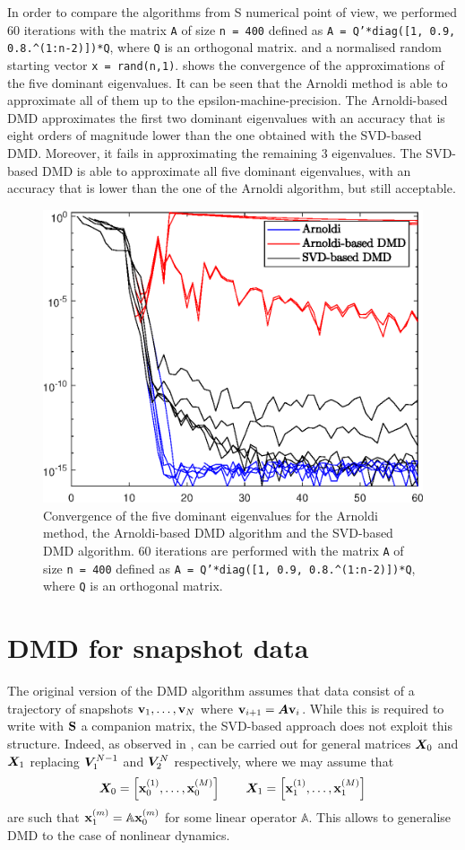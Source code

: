 In order to compare the algorithms from S numerical point of view, we performed 60 iterations with the matrix \texttt{A} of size \texttt{n = 400} defined as \texttt{A = Q'*diag([1, 0.9, 0.8.\^{}(1:n-2)])*Q}, where \texttt{Q} is an orthogonal matrix. and a normalised random starting vector \texttt{x = rand(n,1)}.  shows the convergence of the approximations of the five dominant eigenvalues. It can be seen that the Arnoldi method is able to approximate all of them up to the epsilon-machine-precision. The Arnoldi-based DMD approximates the first two dominant eigenvalues with an accuracy that is eight orders of magnitude lower than the one obtained with the SVD-based DMD. Moreover, it fails in approximating the remaining 3 eigenvalues. The SVD-based DMD is able to approximate all five dominant eigenvalues, with an accuracy that is lower than the one of the Arnoldi algorithm, but still acceptable. 
\begin{figure}[h]
    \centering
    \includegraphics[width=0.5\linewidth]{../code/figures/Arnoldi_vs_DMD.eps}
    \caption{Convergence of the five dominant eigenvalues for the Arnoldi method, the Arnoldi-based DMD algorithm and the SVD-based DMD algorithm. 60 iterations are performed with the matrix \texttt{A} of size \texttt{n = 400} defined as \texttt{A = Q'*diag([1, 0.9, 0.8.\^{}(1:n-2)])*Q}, where \texttt{Q} is an orthogonal matrix.}
    \label{fig_arnoldi_vs_DMD}
\end{figure}

\section{DMD for snapshot data}
\label{section_dmd_koopman}
The original version of the DMD algorithm \cite{schmid_dynamic_2010} assumes that data consist of a trajectory of snapshots $\vb{v}_1, \dots, \vb{v}_N$ where $\vb{v}_{i+1} = \vb*{A}\vb{v}_{i}$. While this is required to write  with $\vb{S}$ a companion matrix, the SVD-based approach does not exploit this structure. Indeed, as observed in \cite{tu_dynamic_2014},  can be carried out for general matrices $\vb*{X}_0$ and $\vb*{X}_1$ replacing $\vb*{V}_1^{N-1}$ and $\vb*{V}_2^{N}$ respectively, where we may assume that
\begin{equation}
    \label{dmd_matrices}
    \vb*{X}_0 = \left[\vb{x}_0^{(1)}, \dots, \vb{x}_0^{(M)}\right] \qquad \vb*{X}_1 = \left[\vb{x}_1^{(1)}, \dots, \vb{x}_1^{(M)}\right]
\end{equation}
are such that $\vb{x}_1^{(m)} = \mathbb{A}\vb{x}_0^{(m)}$ for some linear operator $\mathbb{A}$. This allows to generalise DMD to the case of nonlinear dynamics.

